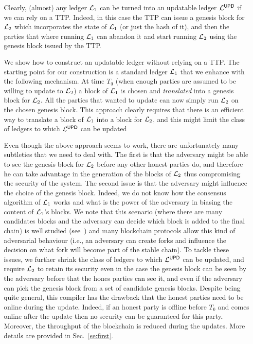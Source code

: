 Clearly, (almost) any ledger $\mathcal{L}_1$ can be turned into an updatable ledger $\mathcal{L}^\mathsf{UPD}$ 
if we can rely on a TTP.
Indeed, in this case the  TTP can issue a genesis block for $\mathcal{L}_2$ which incorporates the state of $\mathcal{L}_1$ (or just the hash of it), and then the parties that where running $\mathcal{L}_1$ can abandon it and start running 
$\mathcal{L}_2$ using the genesis block issued by the TTP.

We show how to construct an updatable ledger without relying on a TTP. The starting point for our construction is
a standard ledger $\mathcal{L}_1$ that we enhance with the following mechanism. At time $T_0$ (when enough parties are assumed to be willing to update to $\mathcal{L}_2$)
a block of $\mathcal{L}_1$ is chosen and \emph{translated} into a genesis block for $\mathcal{L}_2$. All the parties that wanted to update can now simply run $\mathcal{L}_2$ on the chosen genesis block.
This approach clearly requires that there is an efficient way to translate a block of $\mathcal{L}_1$ into a block for $\mathcal{L}_2$, and this might limit the class of ledgers to which $\mathcal{L}^\mathsf{UPD}$ can be updated

Even though the above approach seems to work, there are unfortunately many subtleties that we need to deal with.
The first is that the adversary might be able to see the genesis block for $\mathcal{L}_2$ before any other honest parties do, and therefore he can take advantage in the generation of the blocks of $\mathcal{L}_2$ thus compromising the security of the system. 
The second issue is that the adversary might influence the choice of the genesis block. Indeed, we do not know how the consensus algorithm of $\mathcal{L}_1$ works and what is the power of the adversary in biasing the content of $\mathcal{L}_1$'s blocks. We note that this scenario (where there are many candidates blocks and the adversary can decide which block is added to the final chain) is well studied (see~\cite{EC:GarKiaLeo15}) and many blockchain protocols allow this kind of adversarial behaviour (i.e., an adversary can create forks and influence the decision on what fork will become part of the stable chain). 
To tackle these issues, we further shrink the class of ledgers to which $\mathcal{L}^\mathsf{UPD}$ can be updated, and require
$\mathcal{L}_2$ to retain its security even in the case the genesis block can be seen by the adversary before that the hones parties can see it, and even if the adversary can pick the genesis block from a set of candidate genesis blocks.
Despite being quite general, this compiler has the drawback that the honest parties need to be online during the update. Indeed, if an honest party is offline before $T_0$ and comes online after the update then no security can be guaranteed for this party. Moreover, the throughput of the blockchain is reduced during the updates.  More details are provided in Sec.~\ref{se:first}.

